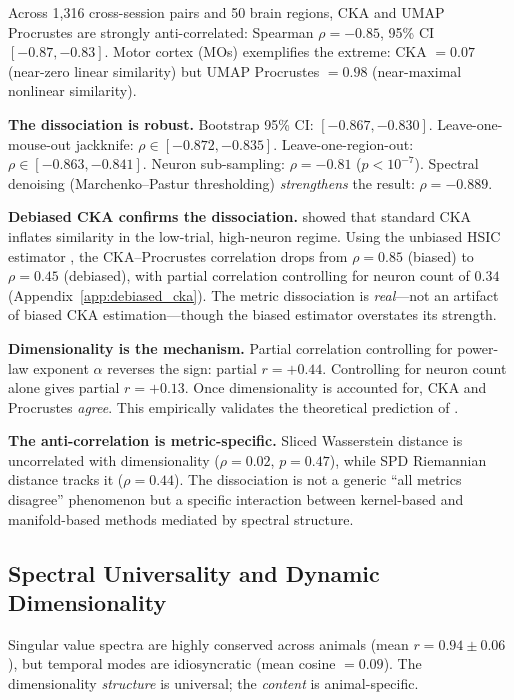 \documentclass{article}
\begin{document}
Across 1,316 cross-session pairs and 50 brain regions, CKA and UMAP Procrustes are strongly anti-correlated: Spearman $\rho = -0.85$, 95\% CI $[-0.87, -0.83]$. Motor cortex (MOs) exemplifies the extreme: CKA $= 0.07$ (near-zero linear similarity) but UMAP Procrustes $= 0.98$ (near-maximal nonlinear similarity).

\textbf{The dissociation is robust.} Bootstrap 95\% CI: $[-0.867, -0.830]$. Leave-one-mouse-out jackknife: $\rho \in [-0.872, -0.835]$. Leave-one-region-out: $\rho \in [-0.863, -0.841]$. Neuron sub-sampling: $\rho = -0.81$ ($p < 10^{-7}$). Spectral denoising (Marchenko--Pastur thresholding) \emph{strengthens} the result: $\rho = -0.889$.

\textbf{Debiased CKA confirms the dissociation.} \citet{murphy2024biased} showed that standard CKA inflates similarity in the low-trial, high-neuron regime. Using the unbiased HSIC estimator \citep{song2012feature}, the CKA--Procrustes correlation drops from $\rho = 0.85$ (biased) to $\rho = 0.45$ (debiased), with partial correlation controlling for neuron count of $0.34$ (Appendix~\ref{app:debiased_cka}). The metric dissociation is \emph{real}---not an artifact of biased CKA estimation---though the biased estimator overstates its strength.

\textbf{Dimensionality is the mechanism.} Partial correlation controlling for power-law exponent $\alpha$ reverses the sign: partial $r = +0.44$. Controlling for neuron count alone gives partial $r = +0.13$. Once dimensionality is accounted for, CKA and Procrustes \emph{agree}. This empirically validates the theoretical prediction of \citet{harvey2024representational}.

\textbf{The anti-correlation is metric-specific.} Sliced Wasserstein distance is uncorrelated with dimensionality ($\rho = 0.02$, $p = 0.47$), while SPD Riemannian distance tracks it ($\rho = 0.44$). The dissociation is not a generic ``all metrics disagree'' phenomenon but a specific interaction between kernel-based and manifold-based methods mediated by spectral structure.

\subsection{Spectral Universality and Dynamic Dimensionality}

Singular value spectra are highly conserved across animals (mean $r = 0.94 \pm 0.06$), but temporal modes are idiosyncratic (mean cosine $= 0.09$). The dimensionality \emph{structure} is universal; the \emph{content} is animal-specific.
\end{document}
